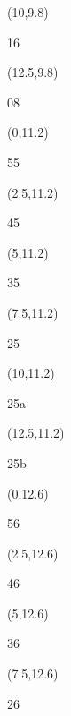 \documentclass[a4paper]{article}
\newcommand{\myseat}[4]{%
\vspace{-0.1cm}
\parbox[t][2.2cm][t]{3.5cm}{
\small #1 %
\begin{description}
\vspace{-0.1cm}
\item [ID:] #2
\vspace{-0.1cm}
\item [Team:] #3 \normalsize
\vspace{-0.1cm}
\item \normalsize #4
\vspace{-0.1cm}
\end{description}
}
}
\begin{document}
\begin{CJK}{UTF8}{cyberbit}
\begin{textblock}{2.5}(10,9.8)
\textblockcolor{}
\myseat{16}{}{}{}
\end{textblock}

\begin{textblock}{2.5}(12.5,9.8)
\textblockcolor{}
\myseat{08}{}{}{}
\end{textblock}

\begin{textblock}{2.5}(0,11.2)
\textblockcolor{}
\myseat{55}{}{}{}
\end{textblock}

\begin{textblock}{2.5}(2.5,11.2)
\textblockcolor{}
\myseat{45}{}{}{}
\end{textblock}

\begin{textblock}{2.5}(5,11.2)
\textblockcolor{}
\myseat{35}{}{}{}
\end{textblock}

\begin{textblock}{2.5}(7.5,11.2)
\textblockcolor{}
\myseat{25}{}{}{}
\end{textblock}

\begin{textblock}{2.5}(10,11.2)
\textblockcolor{}
\myseat{25a}{}{}{}
\end{textblock}

\begin{textblock}{2.5}(12.5,11.2)
\textblockcolor{}
\myseat{25b}{}{}{}
\end{textblock}

\begin{textblock}{2.5}(0,12.6)
\textblockcolor{}
\myseat{56}{}{}{}
\end{textblock}

\begin{textblock}{2.5}(2.5,12.6)
\textblockcolor{}
\myseat{46}{}{}{}
\end{textblock}

\begin{textblock}{2.5}(5,12.6)
\textblockcolor{}
\myseat{36}{}{}{}
\end{textblock}

\begin{textblock}{2.5}(7.5,12.6)
\textblockcolor{}
\myseat{26}{}{}{}
\end{textblock}


\end{CJK}
\end{document}
